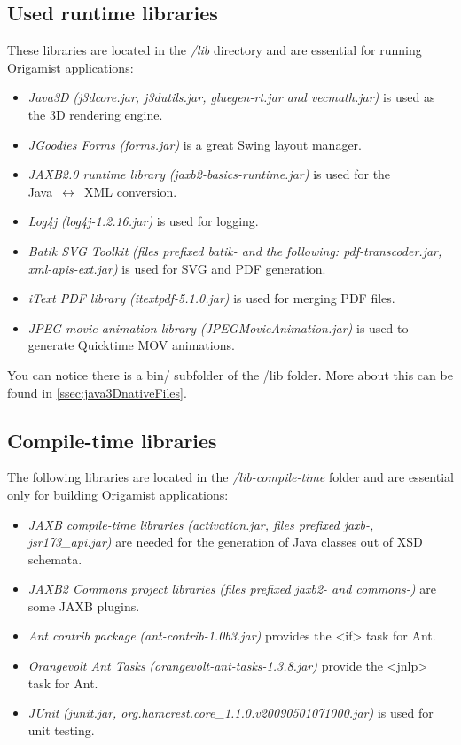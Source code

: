 \subsection{Used runtime libraries}
These libraries are located in the \emph{/lib} directory and are essential for running Origamist applications:
\begin{itemize}
\item \emph{Java3D} \textit{(j3dcore.jar, j3dutils.jar, gluegen-rt.jar and vecmath.jar)} is used as the 3D rendering engine.
\item \emph{JGoodies Forms} \textit{(forms.jar)} is a great Swing layout manager.
\item \emph{JAXB2.0 runtime library} \textit{(jaxb2-basics-runtime.jar)} is used for the \\
Java~$\leftrightarrow$~XML conversion.
\item \emph{Log4j} \textit{(log4j-1.2.16.jar)} is used for logging.
\item \emph{Batik SVG Toolkit} \textit{(files prefixed batik- and the following: pdf-transcoder.jar, xml-apis-ext.jar)} is used for SVG and PDF generation.
\item \emph{iText PDF library} \textit{(itextpdf-5.1.0.jar)} is used for merging PDF files.
\item \emph{JPEG movie animation library} \textit{(JPEGMovieAnimation.jar)} is used to generate Quicktime MOV animations.
\end{itemize}

You can notice there is a bin/ subfolder of the /lib folder. More about this can be found in \ref{ssec:java3DnativeFiles}.

\subsection{Compile-time libraries}
The following libraries are located in the \emph{/lib-compile-time} folder and are essential only for building Origamist applications:
\begin{itemize}
\item \emph{JAXB compile-time libraries} \textit{(activation.jar, files prefixed jaxb-, \\
jsr173\_api.jar)} are needed for the generation of Java classes out of XSD schemata.
\item \emph{JAXB2 Commons project libraries} \textit{(files prefixed jaxb2- and commons-)} are some JAXB plugins.
\item \emph{Ant contrib package} \textit{(ant-contrib-1.0b3.jar)} provides the <if> task for Ant.
\item \emph{Orangevolt Ant Tasks} \textit{(orangevolt-ant-tasks-1.3.8.jar)} provide the <jnlp> task for Ant.
\item \emph{JUnit} \textit{(junit.jar, org.hamcrest.core\_1.1.0.v20090501071000.jar)} is used for unit testing.
\end{itemize}

